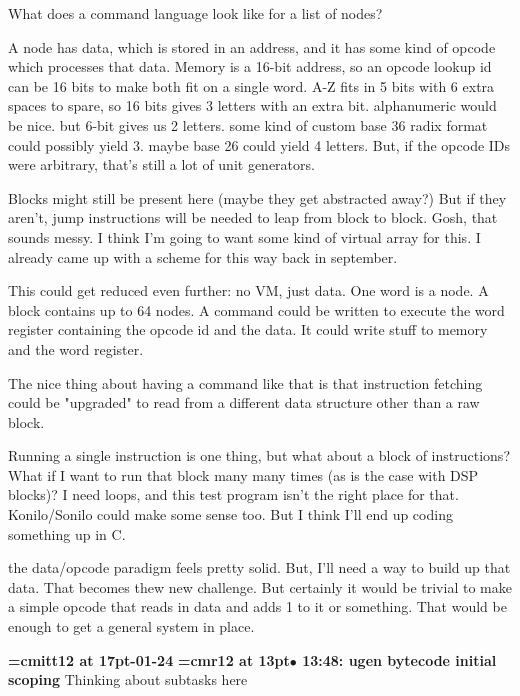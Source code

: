What does a command language look like for a list of nodes?
\par

A node has data, which is stored in an address, and it has some kind of opcode which processes that data. Memory is a 16-bit address, so an opcode lookup id can be 16 bits to make both fit on a single word. A-Z fits in 5 bits with 6 extra spaces to spare, so 16 bits gives 3 letters with an extra bit. alphanumeric would be nice. but 6-bit gives us 2 letters. some kind of custom base 36 radix format could possibly yield 3. maybe base 26 could yield 4 letters. But, if the opcode IDs were arbitrary, that's still a lot of unit generators.
\par

Blocks might still be present here (maybe they get abstracted away?) But if they aren't, jump instructions will be needed to leap from block to block. Gosh, that sounds messy. I think I'm going to want some kind of virtual array for this. I already came up with a scheme for this way back in september.
\par

This could get reduced even further: no VM, just data. One word is a node. A block contains up to 64 nodes. A command could be written to execute the word register containing the opcode id and the data. It could write stuff to memory and the word register.
\par

The nice thing about having a command like that is that instruction fetching could be "upgraded" to read from a different data structure other than a raw block.
\par

Running a single instruction is one thing, but what about a block of instructions? What if I want to run that block many many times (as is the case with DSP blocks)? I need loops, and this test program isn't the right place for that. Konilo/Sonilo could make some sense too. But I think I'll end up coding something up in C.
\par

the data/opcode paradigm feels pretty solid. But, I'll need a way to build up that data. That becomes thew new challenge. But certainly it would be trivial to make a simple opcode that reads in data and adds 1 to it or something. That would be enough to get a general system in place.
\par

{\medskip\noindent\bf\font\titlefont=cmitt12 at 17pt-01-24}\medskip
{\smallskip\noindent\bf\font\titlefont=cmr12 at 13pt\titlefont $\bullet$ 13:48: ugen bytecode initial scoping}\smallskip
Thinking about subtasks here
\par

